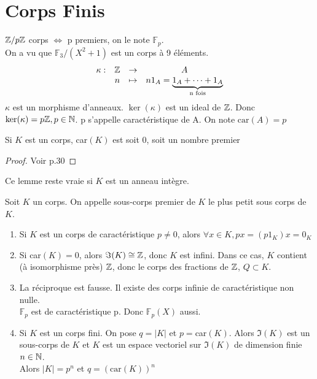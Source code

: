 \documentclass[]{report}
\begin{document}
    \section{Corps Finis}

    \begin{ra}{}{}
        $\mathbb{Z}/p\mathbb{Z}$ corps $\iff$ p premiers, on le note $\mathbb{F}_p$.\\
        On a vu que $\mathbb{F}_3/(X^2+1)$ est un corps à 9 éléments.\\
        $$\begin{array}{ccccc}
    \kappa : & \mathbb{Z} & \to & A \\
      & n & \mapsto & n1_A=\underset{\text{n fois}}{\underbrace{1_A+\dots+1_A}}
    \end{array}$$ $\kappa$ est un morphisme d'anneaux. $\ker(\kappa)$ est un ideal de $\mathbb{Z}$. Donc $\ker(\kappa)=p\mathbb{Z},p\in\mathbb{N}$. p s'appelle caractéristique de A. On note $\text{car}(A)=p$
    \end{ra}

    \begin{lm}{}{}
        Si $K$ est un corps, car$(K)$ est soit 0, soit un nombre premier
    \end{lm}

    \begin{proof}
        Voir p.30
    \end{proof}

    \begin{re}{}{}
        Ce lemme reste vraie si $K$ est un anneau intègre.
    \end{re}

    \begin{df}{}{}
        Soit $K$ un corps. On appelle sous-corps premier de $K$ le plus petit sous corps de $K$.
    \end{df}

    \begin{re}{}{}
        \begin{enumerate}
            \item Si $K$ est un corps de caractéristique $p\neq0$, alors $\forall x\in K,px=(p1_K)x=0_K$
            \item Si car$(K)=0$, alors $\Im(K)\cong\mathbb{Z}$, donc $K$ est infini. Dans ce cas, $K$ contient (à isomorphisme près) $\mathbb{Z}$, donc le corps des fractions de $\mathbb{Z}$, $Q\subset K$.
            \item La réciproque est fausse. Il existe des corps infinie de caractéristique non nulle.\\
            $\mathbb{F}_p$ est de caractéristique p. Donc $\mathbb{F}_p(X)$ aussi.
            \item Si $K$ est un corps fini. On pose $q=|K|$ et $p=$car$(K)$. Alors $\Im(K)$ est un sous-corps de $K$ et $K$ est un espace vectoriel sur $\Im(K)$ de dimension finie $n\in \mathbb{N}$.\\
            Alors $|K|=p^n$ et $q=(\text{car}(K))^n$
        \end{enumerate}
    \end{re}
\end{document}
